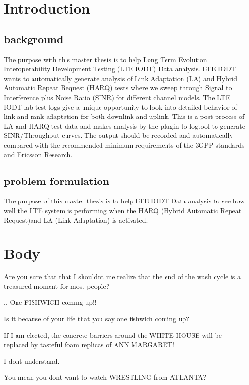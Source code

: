 \documentclass[cropmarks, frame, english]{idamasterthesis}
\author{AUTHOR}
\begin{document}

\makeintropages

\chapter{Introduction}

\section{background}
The purpose with this master thesis is to help Long Term Evolution Interoperability Development Testing (LTE IODT) Data analysis. LTE IODT wants to automatically generate analysis of Link Adaptation (LA) and Hybrid Automatic Repeat Request (HARQ) tests where we sweep through Signal to Interference plus Noise Ratio (SINR) for different channel models. The LTE IODT lab test logs give a unique opportunity to look into detailed behavior of link and rank adaptation for both downlink and uplink.
This is a post-process of LA and HARQ test data and makes analysis by the plugin to logtool to generate SINR/Throughput curves. The output should be recorded and automatically compared with the recommended minimum requirements of the 3GPP standards and Ericsson Research.

\section{problem formulation}
The purpose of this master thesis is to help LTE IODT Data analysis to see how well the LTE system is performing when the HARQ (Hybrid Automatic Repeat Request)and LA (Link Adaptation) is activated. 

\chapter{Body}

Are you sure that that I shouldnt me realize that the end of the wash
cycle is a treasured moment for most people?

..  One FISHWICH coming up!!

Is it because of your life that you say one fishwich coming up?

If I am elected, the concrete barriers around the WHITE HOUSE
 will be replaced by tasteful foam replicas of ANN MARGARET!

I dont understand.

You mean you dont want to watch WRESTLING from ATLANTA?
\end{document}
